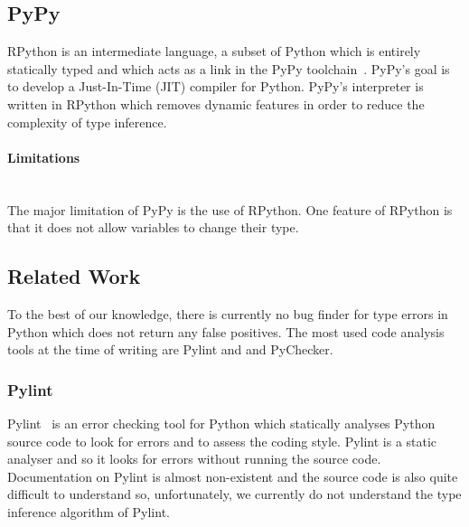 \documentclass[12pt, titlepage]{article}
\begin{document}
\subsection{PyPy}
RPython is an intermediate language, a subset of Python which is entirely statically typed and which acts as a link in the PyPy toolchain~\cite{pypyRpython}. PyPy's goal is to develop a Just-In-Time (JIT) compiler for Python. PyPy's interpreter is written in RPython which removes dynamic features in order to reduce the complexity of type inference.
\paragraph{Limitations}\mbox{}\\
The major limitation of PyPy is the use of RPython. One feature of RPython is that it does not allow variables to change their type.

\subsection{Related Work}
To the best of our knowledge, there is currently no bug finder for type errors in Python which does not return any false positives. The most used code analysis tools at the time of writing are Pylint and and PyChecker.

\subsubsection{Pylint}
Pylint~\cite{pylint} is an error checking tool for Python which statically analyses Python source code to look for errors and to assess the coding style. Pylint is a static analyser and so it looks for errors without running the source code. \\
\indent Documentation on Pylint is almost non-existent and the source code is also quite difficult to understand so, unfortunately, we currently do not understand the type inference algorithm of Pylint.
\end{document}
